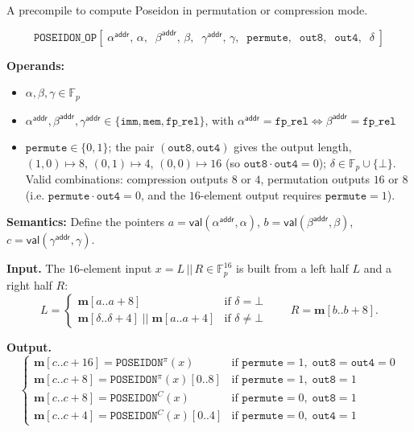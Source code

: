 \documentclass{article}
\theoremstyle{definition}
\newcommand{\Fp}{\mathbb F_p}
\begin{document}
A precompile to compute Poseidon in permutation or compression mode.

\[
\texttt{POSEIDON\_OP}[\;\alpha^\textsf{addr},\, \alpha,\;\; \beta^\textsf{addr},\, \beta,\;\; \gamma^\textsf{addr},\, \gamma,\;\; \texttt{permute},\;\; \texttt{out8},\;\; \texttt{out4},\;\; \delta\;]
\]

\textbf{Operands:}
\begin{itemize}
    \item $\alpha, \beta, \gamma \in \Fp$
    \item $\alpha^\textsf{addr}, \beta^\textsf{addr}, \gamma^\textsf{addr} \in \{\texttt{imm}, \texttt{mem}, \texttt{fp\_rel}\}$, with $\alpha^\textsf{addr} = \texttt{fp\_rel} \Leftrightarrow \beta^\textsf{addr} = \texttt{fp\_rel}$
    \item $\texttt{permute} \in \{0, 1\}$; the pair $(\texttt{out8}, \texttt{out4})$ gives the output length, $(1,0) \mapsto 8$, $(0,1) \mapsto 4$, $(0,0) \mapsto 16$ (so $\texttt{out8}\cdot\texttt{out4} = 0$); $\delta \in \Fp \cup \{\bot\}$. Valid combinations: compression outputs $8$ or $4$, permutation outputs $16$ or $8$ (i.e. $\texttt{permute}\cdot\texttt{out4} = 0$, and the $16$-element output requires $\texttt{permute} = 1$).
\end{itemize}

\textbf{Semantics:} Define the pointers $a = \mathsf{val}(\alpha^\textsf{addr}, \alpha)$, $b = \mathsf{val}(\beta^\textsf{addr}, \beta)$, $c = \mathsf{val}(\gamma^\textsf{addr}, \gamma)$.

\textbf{Input.} The $16$-element input $x = L \,||\, R \in \Fp^{16}$ is built from a left half $L$ and a right half $R$:
\[
L =
\begin{cases}
\textbf{m}[a .. a + 8] & \text{if } \delta = \bot \\[1mm]
\textbf{m}[\delta .. \delta + 4] \;||\; \textbf{m}[a .. a + 4] & \text{if } \delta \neq \bot
\end{cases}
\qquad
R = \textbf{m}[b .. b + 8].
\]

\textbf{Output.}
\[
\begin{cases}
\textbf{m}[c .. c + 16] = \texttt{POSEIDON}^\pi(x) & \text{if } \texttt{permute} = 1,\; \texttt{out8} = \texttt{out4} = 0 \\[1mm]
\textbf{m}[c .. c + 8] = \texttt{POSEIDON}^\pi(x)[0..8] & \text{if } \texttt{permute} = 1,\; \texttt{out8} = 1 \\[1mm]
\textbf{m}[c .. c + 8] = \texttt{POSEIDON}^C(x) & \text{if } \texttt{permute} = 0,\; \texttt{out8} = 1 \\[1mm]
\textbf{m}[c .. c + 4] = \texttt{POSEIDON}^C(x)[0..4] & \text{if } \texttt{permute} = 0,\; \texttt{out4} = 1
\end{cases}
\]
\end{document}
